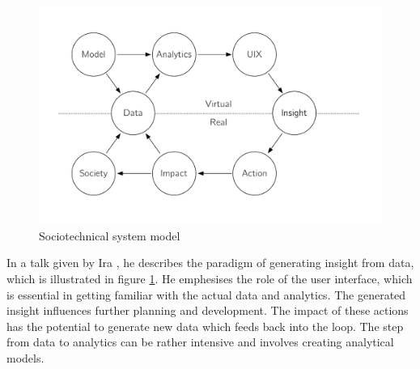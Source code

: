 \begin{figure}[h]
    \centering
    \includegraphics[width=0.8\linewidth]{figures/Loop2.pdf}
    \caption{Sociotechnical system model \cite{winderLoop}}
    \label{fig:loop2}
\end{figure}

In a talk given by Ira \cite{winderLoop}, he describes the paradigm of generating insight from data, which is illustrated in figure \ref{fig:loop2}. He emphesises the role of the user interface, which is essential in getting familiar with the actual data and analytics. The generated insight influences further planning and development. The impact of these actions has the potential to generate new data which feeds back into the loop. The step from data to analytics can be rather intensive and involves creating analytical models. 

